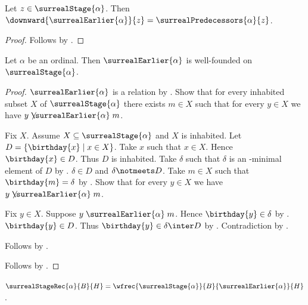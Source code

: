 \begin{proposition}\label{surreal_earlier_downward}
    Let $z\in\surrealStage{\alpha}$.
    Then $\downward{\surrealEarlier{\alpha}}{z}=
        \surrealPredecessors{\alpha}{z}$.
\end{proposition}
\begin{proof}
    Follows by .
\end{proof}

\begin{theorem}\label{surreal_earlier_well_founded}
    Let $\alpha$ be an ordinal.
    Then $\surrealEarlier{\alpha}$ is well-founded on
        $\surrealStage{\alpha}$.
\end{theorem}
\begin{proof}
    $\surrealEarlier{\alpha}$ is a relation by
        .
    Show that for every inhabited subset $X$ of
        $\surrealStage{\alpha}$ there exists $m\in X$ such that
        for every $y\in X$ we have
            $y\not\mathrel{\surrealEarlier{\alpha}}m$.
    \begin{subproof}
        Fix $X$.
        Assume $X\subseteq\surrealStage{\alpha}$ and $X$ is inhabited.
        Let $D=\{\birthday{x}\mid x\in X\}$.
        Take $x$ such that $x\in X$.
        Hence $\birthday{x}\in D$.
        Thus $D$ is inhabited.
        Take $\delta$ such that $\delta$ is an \in-minimal element of $D$
            by .
        $\delta\in D$ and $\delta\notmeets D$.
        Take $m\in X$ such that $\birthday{m}=\delta$ by \auto.
        Show that for every $y\in X$ we have
            $y\not\mathrel{\surrealEarlier{\alpha}}m$.
        \begin{subproof}
            Fix $y\in X$.
            Suppose $y\mathrel{\surrealEarlier{\alpha}}m$.
            Hence $\birthday{y}\in\delta$
                by .
            $\birthday{y}\in D$.
            Thus $\birthday{y}\in\delta\inter D$
                by .
            Contradiction by .
        \end{subproof}
        Follows by \auto.
    \end{subproof}
    Follows by .
\end{proof}

\begin{definition}\label{surreal_stage_recursion}
    $\surrealStageRec{\alpha}{B}{H}=
        \wfrec{\surrealStage{\alpha}}{B}{\surrealEarlier{\alpha}}{H}$.
\end{definition}

